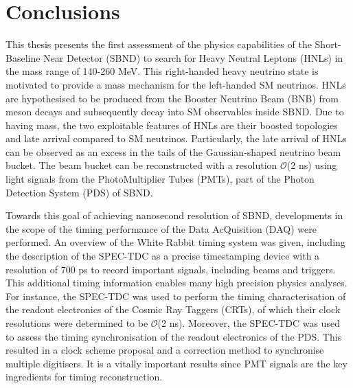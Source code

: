 
\chapter{Conclusions}  %


This thesis presents the first assessment of the physics capabilities of the Short-Baseline Near Detector (SBND) to search for Heavy Neutral Leptons (HNLs) in the mass range of 140-260 MeV.
This right-handed heavy neutrino state is motivated to provide a mass mechanism for the left-handed SM neutrinos.
HNLs are hypothesised to be produced from the Booster Neutrino Beam (BNB) from meson decays and subsequently decay into SM observables inside SBND. 
Due to having mass, the two exploitable features of HNLs are their boosted topologies and late arrival compared to SM neutrinos.
Particularly, the late arrival of HNLs can be observed as an excess in the tails of the Gaussian-shaped neutrino beam bucket.
The beam bucket can be reconstructed with a resolution $\mathcal{O}$(2 ns) using light signals from the PhotoMultiplier Tubes (PMTs), part of the Photon Detection System (PDS) of SBND.

Towards this goal of achieving nanosecond resolution of SBND, developments in the scope of the timing performance of the Data AcQuisition (DAQ) were performed.
An overview of the White Rabbit timing system was given, including the description of the SPEC-TDC as a precise timestamping device with a resolution of 700 ps to record important signals, including beams and triggers.
This additional timing information enables many high precision physics analyses.
For instance, the SPEC-TDC was used to perform the timing characterisation of the readout electronics of the Cosmic Ray Taggers (CRTs), of which their clock resolutions were determined to be $\mathcal{O}$(2 ns).
Moreover, the SPEC-TDC was used to assess the timing synchronisation of the readout electronics of the PDS.
This resulted in a clock scheme proposal and a correction method to synchronise multiple digitisers.
It is a vitally important results since PMT signals are the key ingredients for timing reconstruction.

